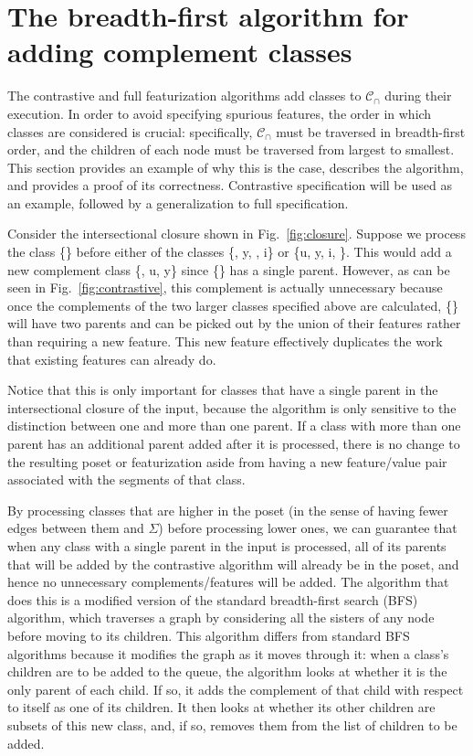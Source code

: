\documentclass[11pt, oneside]{article}   	%
\begin{document}
\section{The breadth-first algorithm for adding complement classes}

The contrastive and full featurization algorithms add classes to $\mathcal{C_\cap}$ during their execution. In order to avoid specifying spurious features, the order in which classes are considered is crucial: specifically, $\mathcal{C_\cap}$ must be traversed in breadth-first order, and the children of each node must be traversed from largest to smallest. This section provides an example of why this is the case, describes the algorithm, and provides a proof of its correctness. Contrastive specification will be used as an example, followed by a generalization to full specification.

Consider the intersectional closure shown in Fig.~\ref{fig:closure}. Suppose we process the class \{\} before either of the classes \{, y, , i\} or \{u, y, i, \}. This would add a new complement class \{, u, y\} since \{\} has a single parent. However, as can be seen in Fig.~\ref{fig:contrastive}, this complement is actually unnecessary because once the complements of the two larger classes specified above are calculated, \{\} will have two parents and can be picked out by the union of their features rather than requiring a new feature. This new feature effectively duplicates the work that existing features can already do.

Notice that this is only important for classes that have a single parent in the intersectional closure of the input, because the algorithm is only sensitive to the distinction between one and more than one parent. If a class with more than one parent has an additional parent added after it is processed, there is no change to the resulting poset or featurization aside from having a new feature/value pair associated with the segments of that class.

By processing classes that are higher in the poset (in the sense of having fewer edges between them and $\Sigma$) before processing lower ones, we can guarantee that when any class with a single parent in the input is processed, all of its parents that will be added by the contrastive algorithm will already be in the poset, and hence no unnecessary complements/features will be added. The algorithm that does this is a modified version of the standard breadth-first search (BFS) algorithm, which traverses a graph by considering all the sisters of any node before moving to its children. This algorithm differs from standard BFS algorithms because it modifies the graph as it moves through it: when a class's children are to be added to the queue, the algorithm looks at whether it is the only parent of each child. If so, it adds the complement of that child with respect to itself as one of its children. It then looks at whether its other children are subsets of this new class, and, if so, removes them from the list of children to be added.
\end{document}
